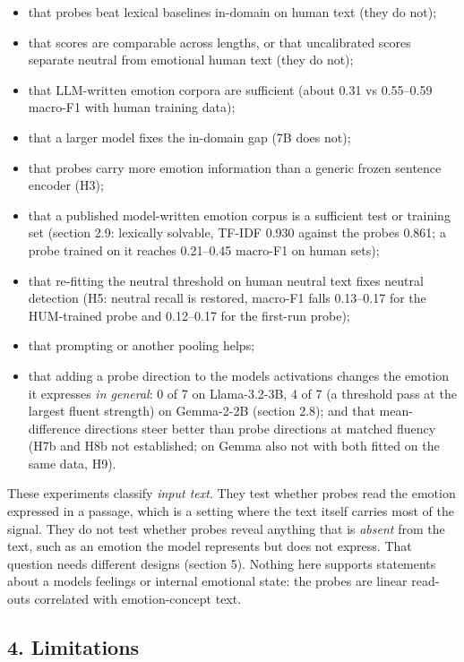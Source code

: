 \documentclass[
  10pt,
]{article}
\providecommand{\tightlist}{%
  \setlength{\itemsep}{0pt}\setlength{\parskip}{0pt}}
\begin{document}
\begin{itemize}
\tightlist
\item
  that probes beat lexical baselines in-domain on human text (they do
  not);
\item
  that scores are comparable across lengths, or that uncalibrated scores
  separate neutral from emotional human text (they do not);
\item
  that LLM-written emotion corpora are sufficient (about 0.31 vs
  0.55--0.59 macro-F1 with human training data);
\item
  that a larger model fixes the in-domain gap (7B does not);
\item
  that probes carry more emotion information than a generic frozen
  sentence encoder (H3);
\item
  that a published model-written emotion corpus is a sufficient test or
  training set (section 2.9: lexically solvable, TF-IDF 0.930 against
  the probe\textquotesingle s 0.861; a probe trained on it reaches
  0.21--0.45 macro-F1 on human sets);
\item
  that re-fitting the neutral threshold on human neutral text fixes
  neutral detection (H5: neutral recall is restored, macro-F1 falls
  0.13--0.17 for the HUM-trained probe and 0.12--0.17 for the first-run
  probe);
\item
  that prompting or another pooling helps;
\item
  that adding a probe direction to the model\textquotesingle s
  activations changes the emotion it expresses \emph{in general}: 0 of 7
  on Llama-3.2-3B, 4 of 7 (a threshold pass at the largest fluent
  strength) on Gemma-2-2B (section 2.8); and that mean-difference
  directions steer better than probe directions at matched fluency (H7b
  and H8b not established; on Gemma also not with both fitted on the
  same data, H9).
\end{itemize}

These experiments classify \emph{input text}. They test whether probes
read the emotion expressed in a passage, which is a setting where the
text itself carries most of the signal. They do not test whether probes
reveal anything that is \emph{absent} from the text, such as an emotion
the model represents but does not express. That question needs different
designs (section 5). Nothing here supports statements about a
model\textquotesingle s feelings or internal emotional state: the probes
are linear read-outs correlated with emotion-concept text.

\subsection{4. Limitations}\label{4-limitations}
\end{document}
